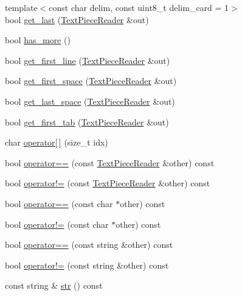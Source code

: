 \begin{DoxyCompactItemize}
\item 
{\footnotesize template$<$const char delim, const uint8\+\_\+t delim\+\_\+card = 1$>$ }\\bool \hyperlink{classuva_1_1utils_1_1file_1_1_text_piece_reader_ab30c25f0057833d23030c78f2ce0ec80}{get\+\_\+last} (\hyperlink{classuva_1_1utils_1_1file_1_1_text_piece_reader}{Text\+Piece\+Reader} \&out)
\item 
bool \hyperlink{classuva_1_1utils_1_1file_1_1_text_piece_reader_acbfcd8655c76ebe29dc327e7900ad66b}{has\+\_\+more} ()
\item 
bool \hyperlink{classuva_1_1utils_1_1file_1_1_text_piece_reader_a064ee10fd3a6b4aef4ab49ccbf0ef870}{get\+\_\+first\+\_\+line} (\hyperlink{classuva_1_1utils_1_1file_1_1_text_piece_reader}{Text\+Piece\+Reader} \&out)
\item 
bool \hyperlink{classuva_1_1utils_1_1file_1_1_text_piece_reader_a0eab2126dd42b02e7058b16dcc4d15f2}{get\+\_\+first\+\_\+space} (\hyperlink{classuva_1_1utils_1_1file_1_1_text_piece_reader}{Text\+Piece\+Reader} \&out)
\item 
bool \hyperlink{classuva_1_1utils_1_1file_1_1_text_piece_reader_a9fc9c2712ada9dbcad8e0da50adc1ee9}{get\+\_\+last\+\_\+space} (\hyperlink{classuva_1_1utils_1_1file_1_1_text_piece_reader}{Text\+Piece\+Reader} \&out)
\item 
bool \hyperlink{classuva_1_1utils_1_1file_1_1_text_piece_reader_abeab8e826f363763ee7edc862afd87d3}{get\+\_\+first\+\_\+tab} (\hyperlink{classuva_1_1utils_1_1file_1_1_text_piece_reader}{Text\+Piece\+Reader} \&out)
\item 
char \hyperlink{classuva_1_1utils_1_1file_1_1_text_piece_reader_acd977f4d1477765989d052e2449de8dc}{operator\mbox{[}$\,$\mbox{]}} (size\+\_\+t idx)
\item 
bool \hyperlink{classuva_1_1utils_1_1file_1_1_text_piece_reader_a83db33c4fa7d0f5979b7c46d9b638ea4}{operator==} (const \hyperlink{classuva_1_1utils_1_1file_1_1_text_piece_reader}{Text\+Piece\+Reader} \&other) const 
\item 
bool \hyperlink{classuva_1_1utils_1_1file_1_1_text_piece_reader_a20a4b17d066fa6f7e03d75f2c13162f6}{operator!=} (const \hyperlink{classuva_1_1utils_1_1file_1_1_text_piece_reader}{Text\+Piece\+Reader} \&other) const 
\item 
bool \hyperlink{classuva_1_1utils_1_1file_1_1_text_piece_reader_a6211ab7b92424aa8822116ce7956d4e5}{operator==} (const char $\ast$other) const 
\item 
bool \hyperlink{classuva_1_1utils_1_1file_1_1_text_piece_reader_ada266cac82f40ee7b0c3d551bcf2ef79}{operator!=} (const char $\ast$other) const 
\item 
bool \hyperlink{classuva_1_1utils_1_1file_1_1_text_piece_reader_aa87727eed46a4ce83dc038c28089002e}{operator==} (const string \&other) const 
\item 
bool \hyperlink{classuva_1_1utils_1_1file_1_1_text_piece_reader_a4f103ea6b27bfcb9ec4c4d7a89330f97}{operator!=} (const string \&other) const 
\item 
const string \& \hyperlink{classuva_1_1utils_1_1file_1_1_text_piece_reader_ab51338c463917c61ebce4cd1d308f551}{str} () const 
\end{DoxyCompactItemize}
